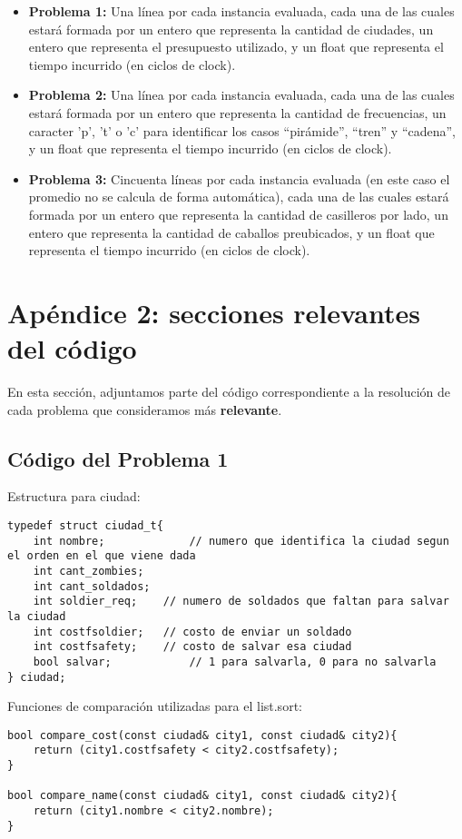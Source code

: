 \documentclass[a4paper]{article}
\begin{document}
\begin{itemize}
\item {\bf Problema 1:} Una línea por cada instancia evaluada, cada una de las cuales estará formada por un entero que representa la cantidad de ciudades, un entero que representa el presupuesto utilizado, y un float que representa el tiempo incurrido (en ciclos de clock).
\item {\bf Problema 2:} Una línea por cada instancia evaluada, cada una de las cuales estará formada por un entero que representa la cantidad de frecuencias, un caracter 'p', 't' o 'c' para identificar los casos ``pirámide'', ``tren'' y ``cadena'', y un float que representa el tiempo incurrido (en ciclos de clock).
\item {\bf Problema 3:} Cincuenta líneas por cada instancia evaluada (en este caso el promedio no se calcula de forma automática), cada una de las cuales estará formada por un entero que representa la cantidad de casilleros por lado, un entero que representa la cantidad de caballos preubicados, y un float que representa el tiempo incurrido (en ciclos de clock).
\end{itemize}

\newpage
\section{Apéndice 2: secciones relevantes del código}
En esta sección, adjuntamos parte del código correspondiente a la resolución de cada problema que consideramos más \textbf{relevante}.

\subsection{Código del Problema 1}
Estructura para ciudad:
\begin{lstlisting}
typedef struct ciudad_t{
	int nombre; 			// numero que identifica la ciudad segun el orden en el que viene dada
    int cant_zombies;
    int cant_soldados;
    int soldier_req;  	// numero de soldados que faltan para salvar la ciudad
    int costfsoldier;  	// costo de enviar un soldado
    int costfsafety;  	// costo de salvar esa ciudad
    bool salvar;			// 1 para salvarla, 0 para no salvarla
} ciudad;
\end{lstlisting}

\vspace*{0.5cm}

Funciones de comparación utilizadas para el list.sort:
\begin{lstlisting}
bool compare_cost(const ciudad& city1, const ciudad& city2){
	return (city1.costfsafety < city2.costfsafety);
}

bool compare_name(const ciudad& city1, const ciudad& city2){
	return (city1.nombre < city2.nombre);
}
\end{lstlisting}
\end{document}
